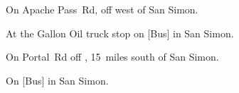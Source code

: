 
\begin{LocationList}

On Apache Pass~Rd, off   west of San Simon.

At the Gallon Oil truck stop on [Bus] in San Simon.

On Portal~Rd off  , 15~miles south of San Simon.

On [Bus] in San Simon.

\end{LocationList}
